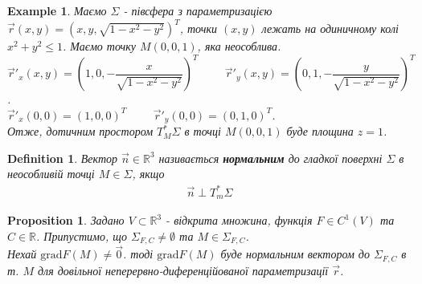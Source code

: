 \documentclass[a4paper, 10pt]{article}
\theoremstyle{theoremdd}
\theoremstyle{theoremdd}
\newtheorem{definition}[theorem]{Definition}
\theoremstyle{theoremdd}
\theoremstyle{theoremdd}
\theoremstyle{theoremdd}
\newtheorem{example}[theorem]{Example}
\theoremstyle{theoremdd}
\theoremstyle{theoremdd}
\theoremstyle{theoremdd}
\theoremstyle{theoremdd}
\newtheorem{proposition}[theorem]{Proposition}
\theoremstyle{theoremdd}
\theoremstyle{theoremdd}
\theoremstyle{theoremdd}
\theoremstyle{theoremdd}
\theoremstyle{theoremdd}
\theoremstyle{theoremdd}
\begin{document}
\begin{example}
Маємо $\Sigma$ - півсфера з параметризацією $\vec{r}(x,y) = (x,y,\sqrt{1-x^2-y^2})^T$, точки $(x,y)$ лежать на одиничному колі $x^2+y^2 \leq 1$. Маємо точку $M(0,0,1)$, яка неособлива.\\
$\vec{r}'_x(x,y) = \left( 1,0 , -\dfrac{x}{\sqrt{1-x^2-y^2}} \right)^T \hspace{1cm} \vec{r}'_y(x,y) = \left( 0,1 , -\dfrac{y}{\sqrt{1-x^2-y^2}} \right)^T$.\\
$\vec{r}'_x(0,0) = (1,0,0)^T \hspace{1cm} \vec{r}'_y(0,0) = (0,1,0)^T$.\\
Отже, дотичним простором $T^*_M \Sigma$ в точці $M(0,0,1)$ буде площина $z = 1$.
\begin{figure}[H]
\centering
{}
\end{figure}
\end{example}

\begin{definition}
Вектор $\vec{n} \in \mathbb{R}^3$ називається \textbf{нормальним} до гладкої поверхні $\Sigma$ в неособливій точці $M \in \Sigma$, якщо
\begin{align*}
\vec{n} \perp T_m^*\Sigma
\end{align*}
\end{definition}

\begin{proposition}
Задано $V \subset \mathbb{R}^3$ - відкрита множина, функція $F \in C^1(V)$ та $C \in \mathbb{R}$. Припустимо, що $\Sigma_{F,C} \neq \emptyset$ та $M \in \Sigma_{F,C}$.\\
Нехай $\text{grad} F(M) \neq \vec{0}$. тоді $\text{grad} F(M)$ буде нормальним вектором до $\Sigma_{F,C}$ в т. $M$ для довільної неперервно-диференційованої параметризації $\vec{r}$.
\end{proposition}
\end{document}
